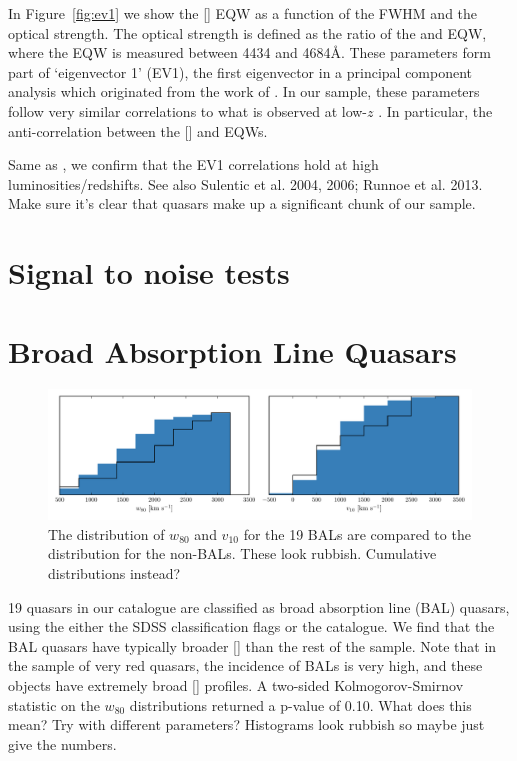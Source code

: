 In Figure~\ref{fig:ev1} we show the [] EQW as a function of the \hb FWHM and the optical  strength. 
The optical  strength is defined as the ratio of the  and \hb EQW, where the  EQW is measured between 4434 and 4684\AA.
These parameters form part of `eigenvector 1' (EV1), the first eigenvector in a principal component analysis which originated from the work of \citet{boroson92}.
In our sample, these parameters follow very similar correlations to what is observed at low-$z$ \citep[e.g.][]{shen14}.
In particular, the anti-correlation between the [] and  EQWs.  

Same as \citet{shen16a}, we confirm that the EV1 correlations hold at high luminosities/redshifts. 
See also Sulentic et al. 2004, 2006; Runnoe et al. 2013. 
Make sure it's clear that \citet{shen16a} quasars make up a significant chunk of our sample. 

\section{Signal to noise tests}


\section{Broad Absorption Line Quasars}

\begin{figure}
    \includegraphics[width=2\columnwidth]{figures/chapter04/bal_hists.pdf} 
    \caption{The distribution of $w_{80}$ and $v_{10}$ for the 19 BALs are compared to the distribution for the non-BALs. These look rubbish. Cumulative distributions instead?}     
    \label{fig:bal_hists}
\end{figure}

19 quasars in our catalogue are classified as broad absorption line (BAL) quasars, using the either the SDSS classification flags or the \citet{allen11} catalogue. 
We find that the BAL quasars have typically broader [] than the rest of the sample. 
Note that in the \citet{zakamska16} sample of very red quasars, the incidence of BALs is very high, and these objects have extremely broad [] profiles. 
A two-sided Kolmogorov-Smirnov statistic on the $w_{80}$ distributions returned a p-value of 0.10. 
What does this mean?
Try with different parameters?
Histograms look rubbish so maybe just give the numbers. 

